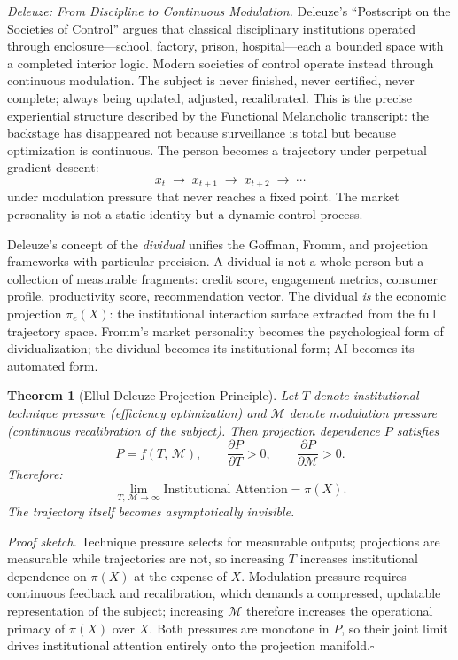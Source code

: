 \documentclass[12pt, a4paper]{article}
\theoremstyle{plain}
\newtheorem{theorem}{Theorem}
\theoremstyle{definition}
\theoremstyle{remark}
\begin{document}
\textit{Deleuze: From Discipline to Continuous Modulation.}
Deleuze's ``Postscript on the Societies of Control'' argues that classical
disciplinary institutions operated through enclosure---school, factory, prison,
hospital---each a bounded space with a completed interior logic.
Modern societies of control operate instead through continuous modulation.
The subject is never finished, never certified, never complete; always being updated,
adjusted, recalibrated.
This is the precise experiential structure described by the Functional Melancholic
transcript: the backstage has disappeared not because surveillance is total but
because optimization is continuous.
The person becomes a trajectory under perpetual gradient descent:
\[
x_t \;\rightarrow\; x_{t+1} \;\rightarrow\; x_{t+2} \;\rightarrow\; \cdots
\]
under modulation pressure that never reaches a fixed point.
The market personality is not a static identity but a dynamic control process.

Deleuze's concept of the \emph{dividual} unifies the Goffman, Fromm, and
projection frameworks with particular precision.
A dividual is not a whole person but a collection of measurable fragments:
credit score, engagement metrics, consumer profile, productivity score,
recommendation vector.
The dividual \emph{is} the economic projection $\pi_e(X)$: the institutional
interaction surface extracted from the full trajectory space.
Fromm's market personality becomes the psychological form of dividualization;
the dividual becomes its institutional form; AI becomes its automated form.

\begin{theorem}[Ellul-Deleuze Projection Principle]
Let $T$ denote institutional technique pressure (efficiency optimization) and
$\mathcal{M}$ denote modulation pressure (continuous recalibration of the subject).
Then projection dependence $P$ satisfies
\[
P = f(T,\,\mathcal{M}), \qquad
\frac{\partial P}{\partial T} > 0, \qquad
\frac{\partial P}{\partial \mathcal{M}} > 0.
\]
Therefore:
\[
\lim_{T,\,\mathcal{M} \to \infty} \text{Institutional Attention} = \pi(X).
\]
The trajectory itself becomes asymptotically invisible.
\end{theorem}

\textit{Proof sketch.}
Technique pressure selects for measurable outputs; projections are measurable
while trajectories are not, so increasing $T$ increases institutional dependence
on $\pi(X)$ at the expense of $X$.
Modulation pressure requires continuous feedback and recalibration, which demands
a compressed, updatable representation of the subject; increasing $\mathcal{M}$
therefore increases the operational primacy of $\pi(X)$ over $X$.
Both pressures are monotone in $P$, so their joint limit drives institutional
attention entirely onto the projection manifold.\hfill$\square$
\end{document}
